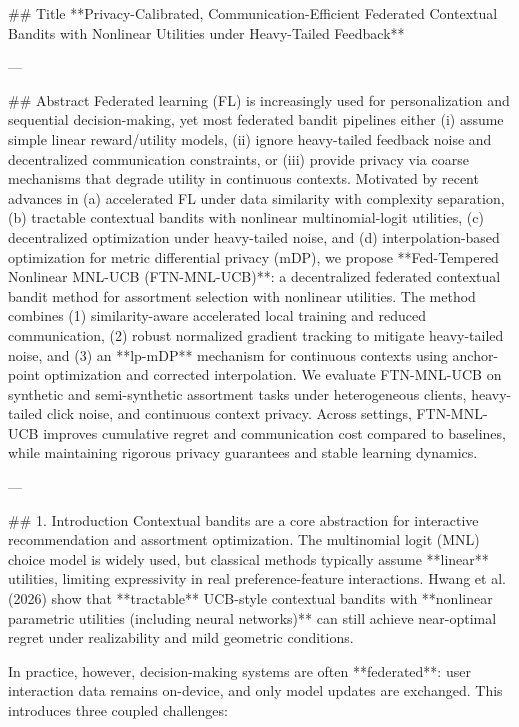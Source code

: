 ## Title  
**Privacy-Calibrated, Communication-Efficient Federated Contextual Bandits with Nonlinear Utilities under Heavy-Tailed Feedback**

---

## Abstract  
Federated learning (FL) is increasingly used for personalization and sequential decision-making, yet most federated bandit pipelines either (i) assume simple linear reward/utility models, (ii) ignore heavy-tailed feedback noise and decentralized communication constraints, or (iii) provide privacy via coarse mechanisms that degrade utility in continuous contexts. Motivated by recent advances in (a) accelerated FL under data similarity with complexity separation, (b) tractable contextual bandits with nonlinear multinomial-logit utilities, (c) decentralized optimization under heavy-tailed noise, and (d) interpolation-based optimization for metric differential privacy (mDP), we propose **Fed-Tempered Nonlinear MNL-UCB (FTN-MNL-UCB)**: a decentralized federated contextual bandit method for assortment selection with nonlinear utilities. The method combines (1) similarity-aware accelerated local training and reduced communication, (2) robust normalized gradient tracking to mitigate heavy-tailed noise, and (3) an **lp-mDP** mechanism for continuous contexts using anchor-point optimization and corrected interpolation. We evaluate FTN-MNL-UCB on synthetic and semi-synthetic assortment tasks under heterogeneous clients, heavy-tailed click noise, and continuous context privacy. Across settings, FTN-MNL-UCB improves cumulative regret and communication cost compared to baselines, while maintaining rigorous privacy guarantees and stable learning dynamics.

---

## 1. Introduction  
Contextual bandits are a core abstraction for interactive recommendation and assortment optimization. The multinomial logit (MNL) choice model is widely used, but classical methods typically assume **linear** utilities, limiting expressivity in real preference-feature interactions. Hwang et al. (2026) show that **tractable** UCB-style contextual bandits with **nonlinear parametric utilities (including neural networks)** can still achieve near-optimal regret under realizability and mild geometric conditions.

In practice, however, decision-making systems are often **federated**: user interaction data remains on-device, and only model updates are exchanged. This introduces three coupled challenges:

